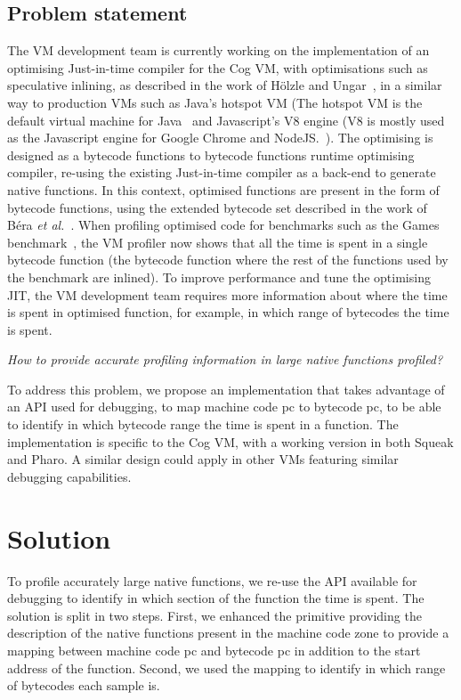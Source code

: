 \documentclass[10pt,preprint,nonatbib]{sigplanconf}
\newcommand{\etal}{\emph{et al.}\xspace}
\begin{document}
\subsection{Problem statement}

The VM development team is currently working on the implementation of an optimising Just-in-time compiler for the Cog VM, with optimisations such as speculative inlining, as described in the work of H\"olzle and Ungar~\cite{Holz94a}, in a similar way to production VMs such as Java's hotspot VM (The hotspot VM is the default virtual machine for Java~\cite{Pale01a} and Javascript's V8 engine (V8 is mostly used as the Javascript engine for Google Chrome and NodeJS.~\cite{V8}). The optimising is designed as a bytecode functions to bytecode functions runtime optimising compiler, re-using the existing Just-in-time compiler as a back-end to generate native functions. In this context, optimised functions are present in the form of bytecode functions, using the extended bytecode set described in the work of B\'era \etal~\cite{Bera14a}. When profiling optimised code for benchmarks such as the Games benchmark~\cite{GameBenchs}, the VM profiler now shows that all the time is spent in a single bytecode function (the bytecode function where the rest of the functions used by the benchmark are inlined). To improve performance and tune the optimising JIT, the VM development team requires more information about where the time is spent in optimised function, for example, in which range of bytecodes the time is spent.

\emph{How to provide accurate profiling information in large native functions profiled?}

To address this problem, we propose an implementation that takes advantage of an API used for debugging, to map machine code pc to bytecode pc, to be able to identify in which bytecode range the time is spent in a function. The implementation is specific to the Cog VM, with a working version in both Squeak and Pharo. A similar design could apply in other VMs featuring similar debugging capabilities.


\section{Solution}

To profile accurately large native functions, we re-use the API available for debugging to identify in which section of the function the time is spent. The solution is split in two steps. First, we enhanced the primitive providing the description of the native functions present in the machine code zone to provide a mapping between machine code pc and bytecode pc in addition to the start address of the function. Second, we used the mapping to identify in which range of bytecodes each sample is.
\end{document}
